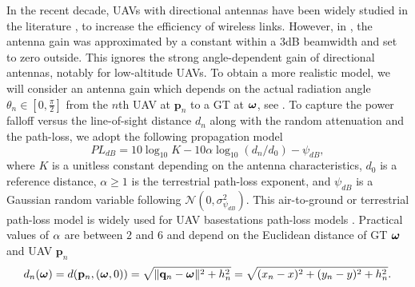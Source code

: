 \documentclass[12pt,onecolumn,journal,draftclsnofoot,letterpaper]{IEEEtran}
\renewcommand{\vq}{\mathbf p}
\renewcommand{\vp}{\mathbf q}
\renewcommand{\vP}{\mathbf Q}
\newcommand{\bH}{\ensuremath{\vh}}          %
\begin{document}
In the recent decade, UAVs with directional antennas have been widely studied in the literature
\cite{BJL,MSF,HA,KMR,HSYR,MWMM}, to increase the efficiency of wireless links. However, in
\cite{BJL,MSF,HA,KMR,HSYR,MWMM}, the antenna gain was approximated by a constant within a 3dB beamwidth and set to zero
outside. This ignores the strong angle-dependent gain of directional antennas, notably for low-altitude UAVs. To obtain a more
realistic model, we will consider an antenna gain which depends on the actual radiation angle
$\theta_n\in[0,\frac{\pi}{2}]$ from the $n$th UAV at $\vq_n$ to a GT at $\boldsymbol{ \omega}$,
see .
%
%
%
%
To capture the power falloff versus the line-of-sight distance $d_n$ along with the random attenuation and the path-loss, 
we adopt the following propagation model \cite[(2.51)]{Gol05} 
%
\begin{equation}
  PL_{dB}=10\log_{10}{K}-10\alpha\log_{10}(d_n/d_0)-\psi_{dB},
\end{equation}
%
where $K$ is a unitless constant depending on the antenna characteristics, $d_0$ is a reference distance, $\alpha\geq 1$
is the terrestrial path-loss exponent, and $\psi_{dB}$ is a Gaussian random variable following
$\mathcal{N}\left(0,\sigma^2_{\psi_{dB}}\right)$. This air-to-ground or terrestrial path-loss model is widely used for
UAV basestations path-loss models \cite{MSBD16a}. Practical values of $\alpha$ are between $2$ and $6$ and depend on the Euclidean
distance of GT $\boldsymbol{ \omega}$ and UAV $\vq_n$
%
\begin{align}
 d_n(\vome)= d(\vq_n,(\vome,0))=\sqrt{\|\vp_n-\vome\|^2+h_n^2}=\sqrt{(x_n-x)^2+(y_n-y)^2+h_n^2}\label{eq:eucd}.
\end{align}
\end{document}
